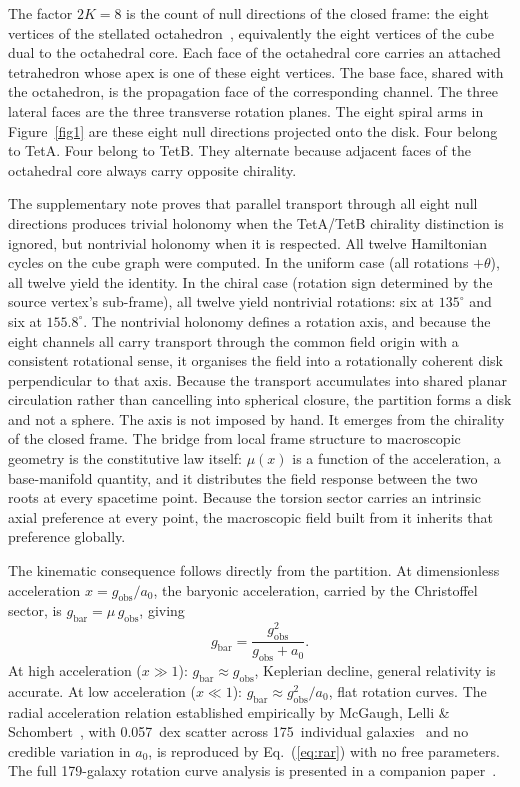 \documentclass[twocolumn]{iopjournal}
\begin{document}
The factor $2K = 8$ is the count of null directions of the
closed frame: the eight vertices of the stellated
octahedron~\cite{Nelson2026a}, equivalently the eight vertices
of the cube dual to the octahedral core.  Each face of the
octahedral core carries an attached tetrahedron whose apex is
one of these eight vertices.  The base face, shared with the
octahedron, is the propagation face of the corresponding channel.  The three lateral faces are the three transverse
rotation planes.  The eight spiral arms in
Figure~\ref{fig1} are these eight null directions
projected onto the disk.  Four belong to TetA.  Four belong to
TetB.  They alternate because adjacent faces of the octahedral
core always carry opposite chirality.

The supplementary note proves that parallel transport through
all eight null directions produces trivial holonomy when the
TetA/TetB chirality distinction is ignored, but nontrivial
holonomy when it is respected.  All twelve Hamiltonian cycles
on the cube graph were computed.  In the uniform case (all
rotations $+\theta$), all twelve yield the identity.  In the
chiral case (rotation sign determined by the source vertex's
sub-frame), all twelve yield nontrivial rotations: six at
$135^{\circ}$ and six at $155.8^{\circ}$.  The nontrivial
holonomy defines a rotation axis, and because the eight
channels all carry transport through the common field origin
with a consistent rotational sense, it organises the field
into a rotationally coherent disk perpendicular to that axis.
Because the transport accumulates into shared planar
circulation rather than cancelling into spherical closure, the
partition forms a disk and not a sphere.  The
axis is not imposed by hand.  It emerges from the chirality
of the closed frame.  The bridge from local frame structure to
macroscopic geometry is the constitutive law itself: $\mu(x)$
is a function of the acceleration, a base-manifold quantity,
and it distributes the field response between the two roots at
every spacetime point.  Because the torsion sector carries an
intrinsic axial preference at every point, the macroscopic
field built from it inherits that preference globally.

The kinematic consequence follows directly from the partition.
At dimensionless acceleration $x = g_{\mathrm{obs}}/a_0$, the
baryonic acceleration, carried by the Christoffel sector, is
$g_{\mathrm{bar}} = \mu\,g_{\mathrm{obs}}$, giving
\begin{equation}
  g_{\mathrm{bar}} =
  \frac{g_{\mathrm{obs}}^2}{g_{\mathrm{obs}} + a_0}.
  \label{eq:rar}
\end{equation}
At high acceleration ($x \gg 1$):
$g_{\mathrm{bar}} \approx g_{\mathrm{obs}}$, Keplerian
decline, general relativity is accurate.  At low acceleration
($x \ll 1$):
$g_{\mathrm{bar}} \approx g_{\mathrm{obs}}^2/a_0$, flat
rotation curves.  The radial acceleration relation established
empirically by McGaugh, Lelli \&
Schombert~\cite{McGaugh2016}, with 0.057~dex scatter across
175~individual galaxies~\cite{Li2018} and no credible
variation in $a_0$, is reproduced by Eq.~(\ref{eq:rar}) with
no free parameters.  The full 179-galaxy rotation curve
analysis is presented in a companion
paper~\cite{Nelson2026c}.
\end{document}
